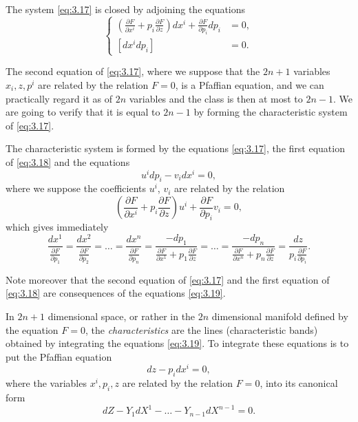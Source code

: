 \documentclass[leqno,11pt]{book}
\numberwithin{equation}{chapter}
\newcommand{\pd}{\partial}
\theoremstyle{shape1}
\theoremstyle{shape0}
\theoremstyle{shape2}
\theoremstyle{definition}
\begin{document}
The system \eqref{eq:3.17} is closed by adjoining the equations
\begin{equation}
  \label{eq:3.18}
  \left\{
    \begin{aligned}
      \left(\frac{\pd F}{\pd x^{i}}+p_{i}\frac{\pd F}{\pd z}\right) dx^{i}+\frac{\pd F}{\pd p_{i}}dp_{i}&=0,\\
      [dx^{i}dp_{i}]&=0.
    \end{aligned}
  \right.
\end{equation}

The second equation of \eqref{eq:3.17}, where we suppose that the $2n+1$ variables $x_{i},z,p^{i}$ are related by the relation $F=0$, is a Pfaffian equation, and we can practically regard it as of $2n$ variables and the class is then at most to $2n-1$. We are going to verify that it is equal to $2n-1$ by forming the characteristic system of \eqref{eq:3.17}.

The characteristic system is formed by the equations \eqref{eq:3.17}, the first equation of \eqref{eq:3.18} and the equations
\[
u^{i}dp_{i}-v_{i}dx^{i}=0,
\]
where we suppose the coefficients $u^{i}$, $v_{i}$ are related by the relation
\[
\left(\frac{\pd F}{\pd x^{i}}+p_{i}\frac{\pd F}{\pd z}\right)u^{i}+\frac{\pd F}{\pd p_{i}}v_{i}=0,
\]
which gives immediately
\begin{equation}
  \label{eq:3.19}
  \frac{dx^{1}}{\frac{\pd F}{\pd p_{1}}}=
  \frac{dx^{2}}{\frac{\pd F}{\pd p_{2}}}=
  \dots=
  \frac{dx^{n}}{\frac{\pd F}{\pd p_{n}}}=
  \frac{-dp_{1}}{\frac{\pd F}{\pd x^{1}}+p_{1}\frac{\pd F}{\pd z}}=
  \dots=
  \frac{-dp_{n}}{\frac{\pd F}{\pd x^{n}}+p_{n}\frac{\pd F}{\pd z}}=
  \frac{dz}{p_{i}\frac{\pd F}{\pd p_{i}}}.
\end{equation}

Note moreover that the second equation of \eqref{eq:3.17} and the first equation of \eqref{eq:3.18} are consequences of the equations \eqref{eq:3.19}.

\vspace{12pt}\fsec In $2n+1$ dimensional space, or rather in the $2n$ dimensional manifold defined by the equation $F=0$, the \emph{characteristics} are the lines (characteristic bands) obtained by integrating the equations \eqref{eq:3.19}. To integrate  these equations is to put the Pfaffian equation
\[
dz-p_{i}dx^{i}=0,
\]
where the variables $x^{i},p_{i},z$ are related by the relation $F=0$,  into its canonical form
\begin{equation}
  \label{eq:3.20}
  dZ-Y_{1}dX^{1}-\dots-Y_{n-1}dX^{n-1}=0.
\end{equation}
\end{document}

